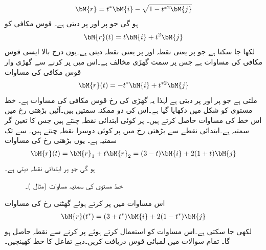 \begin{align*}
\bM{r}=t^*\bM{i}-\sqrt{1-t^{*2}\bM{j}}
\end{align*}
ہو گی جو  پر  اور  پر  دیتی ہے۔
قوس مکافی  کو
\begin{align*}
\bM{r}(t)=t\bM{i}+t^2\bM{j}
\end{align*}
لکھا جا سکتا ہے جو  پر  یعنی نقطہ  اور  پر  یعنی نقطہ  دیتی ہے۔یوں درج بالا  ایسی قوس مکافی کی مساوات ہے جس پر سمت گھڑی مخالف ہے۔اس میں  پر کرنے سے گھڑی وار  قوس مکافی کی مساوات 
\begin{align*}
\bM{r}(t)=-t^*\bM{i}+t^{*2}\bM{j}
\end{align*}
ملتی ہے جو  پر  اور  پر  دیتی ہے لہٰذا یہ گھڑی کی رخ قوس مکافی کی مساوات ہے۔
خط مستوی  کو شکل  میں دکھایا گیا ہے۔اس کی دو ممکنہ سمتیں ہیں۔آئیں بڑھتی  رخ میں اس خط کی  مساوات حاصل کرتے ہیں۔ پر کوئی ابتدائی نقطہ   چنتے ہیں جس کا  تعین گر سمتیہ   ہے۔ابتدائی نقطے سے بڑھتی  رخ میں  پر کوئی دوسرا نقطہ  چنتے ہیں۔ سے  تک سمتیہ  ہے۔ یوں بڑھتی  رخ  کی مساوات 
\begin{align*}
\bM{r}(t)=\bM{r}_1+t\bM{r}_2=(3-t)\bM{i}+2(1+t)\bM{j}
\end{align*}
 ہو گی جو  پر ابتدائی نقطہ  دیتی ہے۔
\begin{figure}
\centering
{}
\caption{خط مستوی کی سمتیہ  مساوات (مثال )۔}
\label{شکل_مثال_الاحصاء_خط_مستوی_سمتی}
\end{figure}

اس مساوات میں  پر کرتے ہوئے گھٹتی  رخ  کی مساوات 
\begin{align*}
\bM{r}(t^*)=(3+t^*)\bM{i}+2(1-t^*)\bM{j}
\end{align*}
لکھی جا سکتی ہے۔اس مساوات کو استعمال کرتے ہوئے   پر کرنے سے نقطہ  حاصل ہو گا۔ 
تمام سوالات میں لمبائی قوس دریافت کریں۔دیے تفاعل کا خط کھینچیں۔

